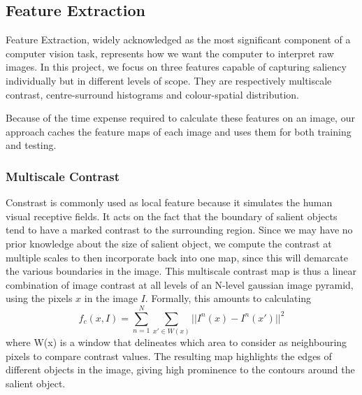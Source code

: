 \documentclass[10pt,twocolumn,letterpaper]{article}
\newcommand{\SUM}{\sum\limits}
\newcommand{\BOLD}{\textbf}
\begin{document}
\subsection{Feature Extraction}
Feature Extraction, widely acknowledged as the most significant component of a computer vision task, represents how we want the computer to interpret raw images. In this project, we focus on three features capable of capturing saliency individually but in different levels of scope. They are respectively multiscale contrast, centre-surround histograms  and colour-spatial distribution.

Because of the time expense required to calculate these features on an image, our approach caches the feature maps of each image and uses them for both training and testing.
\subsubsection{Multiscale Contrast}

Constrast is commonly used as local feature because it simulates the human visual receptive fields. It acts on the fact that the boundary of salient objects tend to have a marked contrast to the surrounding region. Since we may have no prior knowledge about the size of salient object, we compute the contrast at multiple scales to then incorporate back into one map, since this will demarcate the various boundaries in the image.  This multiscale contrast map is thus a linear combination of image contrast at all levels of an N-level gaussian image pyramid, using the pixels $x$ in the image $I$.  Formally, this amounts to calculating $$f_c(x,I) = \SUM_{n = 1}^{N}\SUM_{x'\in W(x)}||I^n(x)-I^n(x')||^2$$ where W(x) is a window that delineates which area to consider as neighbouring pixels to compare contrast values.  The resulting map highlights the edges of different objects in the image, giving high prominence to the contours around the salient object.

\end{document}
